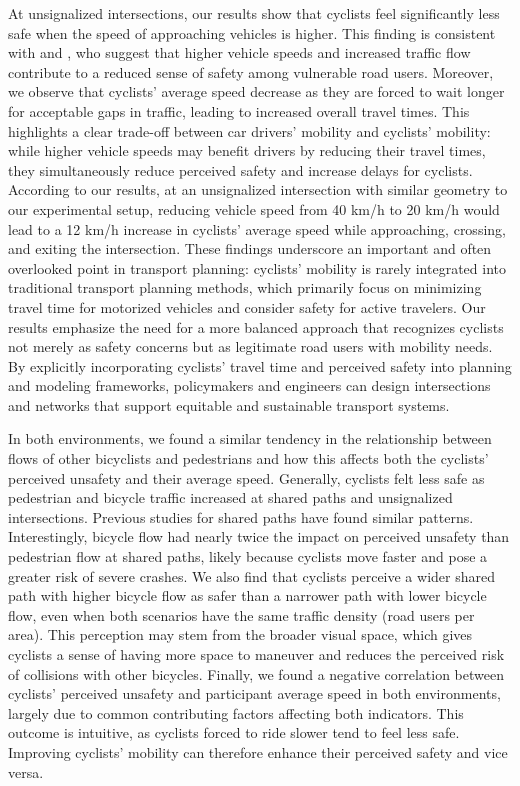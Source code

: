 \documentclass[3p,authoryear]{elsarticle}
\begin{document}
At unsignalized intersections, our results show that cyclists feel significantly
less safe when the speed of approaching vehicles is higher. This finding is
consistent with \citet{beura2021unsignalized} and \citet{jensen2012pedestrian},
who suggest that higher vehicle speeds and increased traffic flow contribute to a
reduced sense of safety among vulnerable road users. Moreover, we observe that
cyclists' average speed decrease as they are forced to wait longer for acceptable
gaps in traffic, leading to increased overall travel times. This highlights a
clear trade-off between car drivers' mobility and cyclists' mobility: while
higher vehicle speeds may benefit drivers by reducing their travel times, they
simultaneously reduce perceived safety and increase delays for cyclists.
According to our results, at an unsignalized intersection with similar geometry
to our experimental setup, reducing vehicle speed from 40 km/h to 20 km/h would
lead to a 12 km/h increase in cyclists' average speed while approaching,
crossing, and exiting the intersection. These findings underscore an important
and often overlooked point in transport planning: cyclists' mobility is rarely
integrated into traditional transport planning methods, which primarily focus on
minimizing travel time for motorized vehicles and consider safety for active
travelers. Our results emphasize the need for a more balanced approach that
recognizes cyclists not merely as safety concerns but as legitimate road users
with mobility needs. By explicitly incorporating cyclists' travel time and
perceived safety into planning and modeling frameworks, policymakers and
engineers can design intersections and networks that support equitable and
sustainable transport systems.

In both environments, we found a similar tendency in the relationship between
flows of other bicyclists and pedestrians and how this affects both the cyclists'
perceived unsafety and their average speed. Generally, cyclists felt less safe as
pedestrian and bicycle traffic increased at shared paths and unsignalized
intersections. Previous studies for shared paths
\citep{berghoefer2023prefer,gkekas2020perceived} have found similar patterns.
Interestingly, bicycle flow had nearly twice the impact on perceived unsafety
than pedestrian flow at shared paths, likely because cyclists move faster and
pose a greater risk of severe crashes. We also find that cyclists perceive a
wider shared path with higher bicycle flow as safer than a narrower path with
lower bicycle flow, even when both scenarios have the same traffic density (road
users per area). This perception may stem from the broader visual space, which
gives cyclists a sense of having more space to maneuver and reduces the perceived
risk of collisions with other bicycles. Finally, we found a negative correlation
between cyclists' perceived unsafety and participant average speed in both
environments, largely due to common contributing factors affecting both
indicators. This outcome is intuitive, as cyclists forced to ride slower tend to
feel less safe. Improving cyclists' mobility can therefore enhance their
perceived safety and vice versa.
\end{document}
